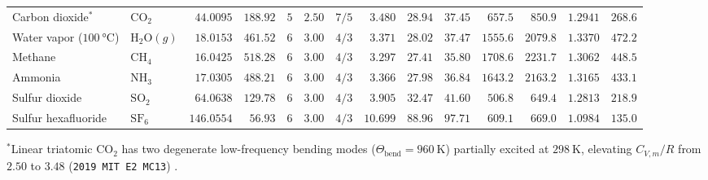 \begin{table}[!htbp]
\begin{tabularx}{\linewidth}{@{}l l r r c r r r r r r r r r@{}}
Carbon dioxide$^*$ & $\mathrm{CO_2}$ & $44.0095$ & $188.92$ & $5$ & $2.50$ & $7/5$ & $\mathbf{3.480}$ & $28.94$ & $37.45$ & $657.5$ & $850.9$ & $1.2941$ & $268.6$ \\
Water vapor ($\SI{100}{\celsius}$) & $\mathrm{H_2O}(g)$ & $18.0153$ & $461.52$ & $6$ & $3.00$ & $4/3$ & $3.371$ & $28.02$ & $37.47$ & $1555.6$ & $2079.8$ & $1.3370$ & $472.2$ \\
Methane & $\mathrm{CH_4}$ & $16.0425$ & $518.28$ & $6$ & $3.00$ & $4/3$ & $3.297$ & $27.41$ & $35.80$ & $1708.6$ & $2231.7$ & $1.3062$ & $448.5$ \\
Ammonia & $\mathrm{NH_3}$ & $17.0305$ & $488.21$ & $6$ & $3.00$ & $4/3$ & $3.366$ & $27.98$ & $36.84$ & $1643.2$ & $2163.2$ & $1.3165$ & $433.1$ \\
Sulfur dioxide & $\mathrm{SO_2}$ & $64.0638$ & $129.78$ & $6$ & $3.00$ & $4/3$ & $3.905$ & $32.47$ & $41.60$ & $506.8$ & $649.4$ & $1.2813$ & $218.9$ \\
Sulfur hexafluoride & $\mathrm{SF_6}$ & $146.0554$ & $56.93$ & $6$ & $3.00$ & $4/3$ & $\mathbf{10.699}$ & $88.96$ & $97.71$ & $609.1$ & $669.0$ & $1.0984$ & $135.0$ \\
\bottomrule
\end{tabularx}
\par\vspace{1pt}\raggedright{\scriptsize $^*$Linear triatomic $\mathrm{CO_2}$ has two degenerate low-frequency bending modes ($\Theta_{\mathrm{bend}} = \SI{960}{\kelvin}$) partially excited at $\SI{298}{\kelvin}$, elevating $C_{V,m}/R$ from $2.50$ to $3.48$ (\texttt{2019 MIT E2 MC13}) .}
\end{table}

